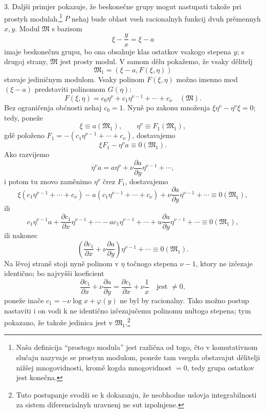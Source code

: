 \documentclass[11pt]{article}
\begin{document}
3. Daljši primjer pokazuje, že beskonečne grupy mogut nastupati takože pri prostyh modulah.\footnote{Naša definicija ``prostogo modula'' jest različna od togo, čto v komutativnom slučaju nazyvaje se prostym modulom, poneže tam vsegda obstavajut dělitelji nižšej mnogovidnosti, kromě kogda mnogovidnost \(=0\), tedy grupa ostatkov jest konečna.} \(P\) nehaj bude oblast vseh racionalnyh funkcij dvuh prěmennyh \(x,y\). Modul \(\mathfrak M\) s bazisom
\[
 \xi-\frac{y}{x}=\xi-a
\]
imaje beskonečnu grupu, bo ona obsahuje klas ostatkov vsakogo stepena \(y\); s drugoj strany, \(\mathfrak M\) jest prosty modul. V samom dělu pokažemo, že vsaky dělitelj
\[
 \mathfrak M_1=(\xi-a,
F(\xi,\eta))
\]
stavaje jediničnym modulom. Vsaky polinom \(F(\xi,\eta)\) možno imenno mod\((\xi-a)\) predstaviti polinomom \(G(\eta)\):
\[
 F(\xi,\eta)=c_0\eta^\nu+c_1\eta^{\nu-1}+\cdots+c_\nu\quad(\mathfrak M).
\]
Bez ograničenja obćnosti nehaj \(c_0=1\). Nyně po zakonu množenja \(\xi\eta^\nu-\eta^\nu\xi=0\); tedy, poneže
\[
 \xi\equiv a(\mathfrak M_1),
 \qquad
 \eta^\nu\equiv F_1(\mathfrak M_1),
\]
gdě položeno \(F_1=-(c_1\eta^{\nu-1}+\cdots+c_\nu)\), dostavajemo
\[
 \xi F_1-\eta^\nu a\equiv0(\mathfrak M_1).
\]
Ako razvijemo
\[
 \eta^\nu a=a\eta^\nu+\nu\frac{\partial a}{\partial y}\eta^{\nu-1}+\cdots,
\]
i potom tu znovo zaměnimo \(\eta^\nu\) črez \(F_1\), dostavajemo
\[
 \xi(c_1\eta^{\nu-1}+\cdots+c_\nu)-a(c_1\eta^{\nu-1}+\cdots+c_\nu)
 +\nu\frac{\partial a}{\partial y}\eta^{\nu-1}+\cdots\equiv0(\mathfrak M_1),
\]
ili
\[
 c_1\eta^{\nu-1}a+\frac{\partial c_1}{\partial x}\eta^{\nu-1}+\cdots
 -ac_1\eta^{\nu-1}+\cdots+
u\frac{\partial a}{\partial y}\eta^{\nu-1}+\cdots
 \equiv0(\mathfrak M_1),
\]
ili nakonec
\[
 \left(\frac{\partial c_1}{\partial x}+\nu\frac{\partial a}{\partial y}\right)\eta^{\nu-1}+\cdots
 \equiv0(\mathfrak M_1).
\]
Na lěvoj straně stoji nyně polinom v \(\eta\) točnogo stepena \(\nu-1\), ktory ne izčezaje identično; bo najvyšši koeficient
\[
 \frac{\partial c_1}{\partial x}+\nu\frac{\partial a}{\partial y}
 =\frac{\partial c_1}{\partial x}+\nu\frac{1}{x}
 \quad\text{jest }\ne0,
\]
poneže inače \(c_1=-\nu\log x+\varphi(y)\) ne byl by racionalny. Tako možno postup nastaviti i on vodi k ne identično izčezajučemu polinomu nultogo stepena; tym pokazano, že takože jedinica jest v \(\mathfrak M_1\).\footnote{Tuto postupanje svodži se k dokazanju, že neobhodne uslovja integrabilnosti za sistem diferencialnyh uravnenj ne sut izpolnjene.}
\end{document}
